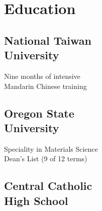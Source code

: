 \documentclass[a4paper]{deedy-resume-proximanova-sanfran} %
\begin{document}
\begin{minipage}[t]{0.33\textwidth} %


\section{Education} 

\subsection[National Taiwan University]{National Taiwan\\University}

Nine months of intensive \\
Mandarin Chinese training \\

\sectionspace %

\subsection[Oregon State University]{Oregon State\\University}

Speciality in Materials Science \\
Dean's List (9 of 12 terms) \\

\sectionspace %


\subsection[Central Catholic High School]{Central Catholic\\High School}


\sectionspace %



\end{minipage}
\end{document}
